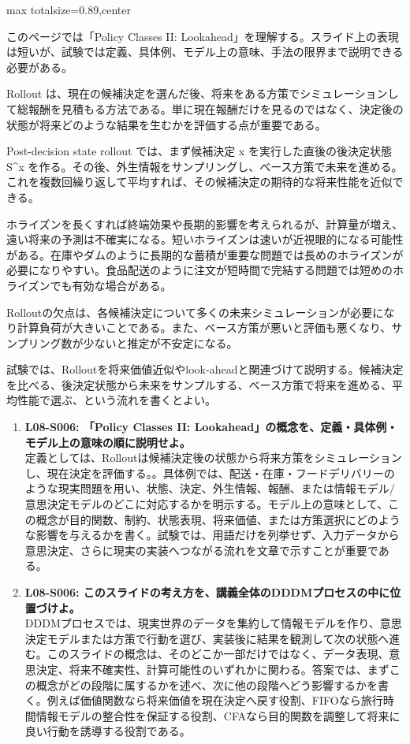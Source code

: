 \begin{minipage}[t]{0.58\textwidth}
\begin{adjustbox}{max totalsize={\textwidth}{0.89\textheight},center}
\begin{minipage}{\textwidth}\scriptsize
{}このページでは「Policy Classes II: Lookahead」を理解する。スライド上の表現は短いが、試験では定義、具体例、モデル上の意味、手法の限界まで説明できる必要がある。\par
Rollout は、現在の候補決定を選んだ後、将来をある方策でシミュレーションして総報酬を見積もる方法である。単に現在報酬だけを見るのではなく、決定後の状態が将来どのような結果を生むかを評価する点が重要である。\par
Post-decision state rollout では、まず候補決定 x を実行した直後の後決定状態 S\textasciicircum{}x を作る。その後、外生情報をサンプリングし、ベース方策で未来を進める。これを複数回繰り返して平均すれば、その候補決定の期待的な将来性能を近似できる。\par
ホライズンを長くすれば終端効果や長期的影響を考えられるが、計算量が増え、遠い将来の予測は不確実になる。短いホライズンは速いが近視眼的になる可能性がある。在庫やダムのように長期的な蓄積が重要な問題では長めのホライズンが必要になりやすい。食品配送のように注文が短時間で完結する問題では短めのホライズンでも有効な場合がある。\par
Rolloutの欠点は、各候補決定について多くの未来シミュレーションが必要になり計算負荷が大きいことである。また、ベース方策が悪いと評価も悪くなり、サンプリング数が少ないと推定が不安定になる。\par
試験では、Rolloutを将来価値近似やlook-aheadと関連づけて説明する。候補決定を比べる、後決定状態から未来をサンプルする、ベース方策で将来を進める、平均性能で選ぶ、という流れを書くとよい。\par{}\begin{enumerate}\item \textbf{L08-S006: 「Policy Classes II: Lookahead」の概念を、定義・具体例・モデル上の意味の順に説明せよ。}\\定義としては、Rolloutは候補決定後の状態から将来方策をシミュレーションし、現在決定を評価する。。具体例では、配送・在庫・フードデリバリーのような現実問題を用い、状態、決定、外生情報、報酬、または情報モデル/意思決定モデルのどこに対応するかを明示する。モデル上の意味として、この概念が目的関数、制約、状態表現、将来価値、または方策選択にどのような影響を与えるかを書く。試験では、用語だけを列挙せず、入力データから意思決定、さらに現実の実装へつながる流れを文章で示すことが重要である。\item \textbf{L08-S006: このスライドの考え方を、講義全体のDDDMプロセスの中に位置づけよ。}\\DDDMプロセスでは、現実世界のデータを集約して情報モデルを作り、意思決定モデルまたは方策で行動を選び、実装後に結果を観測して次の状態へ進む。このスライドの概念は、そのどこか一部だけではなく、データ表現、意思決定、将来不確実性、計算可能性のいずれかに関わる。答案では、まずこの概念がどの段階に属するかを述べ、次に他の段階へどう影響するかを書く。例えば価値関数なら将来価値を現在決定へ戻す役割、FIFOなら旅行時間情報モデルの整合性を保証する役割、CFAなら目的関数を調整して将来に良い行動を誘導する役割である。\end{enumerate}

\end{minipage}
\end{adjustbox}
\end{minipage}
